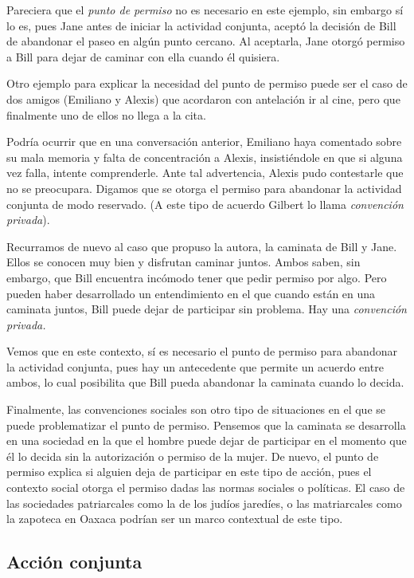 \documentclass[oneside]{book}
\begin{document}
Pareciera que el \textit{punto de permiso} no es necesario en este ejemplo, sin embargo sí lo es, pues Jane antes de iniciar la actividad conjunta, aceptó la decisión de Bill de abandonar el paseo en algún punto cercano. Al aceptarla, Jane otorgó permiso a Bill para dejar de caminar con ella cuando él quisiera.

Otro ejemplo para explicar la necesidad del punto de permiso puede ser el caso de dos amigos (Emiliano y Alexis) que acordaron con antelación ir al cine, pero que finalmente uno de ellos no llega a la cita.

Podría ocurrir que en una conversación anterior, Emiliano haya comentado sobre su mala memoria y falta de concentración a Alexis, insistiéndole en que si alguna vez falla, intente comprenderle. Ante tal advertencia, Alexis pudo contestarle que no se preocupara. Digamos que se otorga el permiso para abandonar la actividad conjunta de modo reservado. (A este tipo de acuerdo Gilbert lo llama \textit{convención privada}).

Recurramos de nuevo al caso que propuso la autora, la caminata de Bill y Jane. Ellos se conocen muy bien y disfrutan caminar juntos. Ambos saben, sin embargo, que Bill encuentra incómodo tener que pedir permiso por algo. Pero pueden haber desarrollado un entendimiento en el que cuando están en una caminata juntos, Bill puede dejar de participar sin problema. Hay una \textit{convención privada. }

Vemos que en este contexto, sí es necesario el punto de permiso para abandonar la actividad conjunta, pues hay un antecedente que permite un acuerdo entre ambos, lo cual posibilita que Bill pueda abandonar la caminata cuando lo decida.

Finalmente, las convenciones sociales son otro tipo de situaciones en el que se puede problematizar el punto de permiso. Pensemos que la caminata se desarrolla en una sociedad en la que el hombre puede dejar de participar en el momento que él lo decida sin la autorización o permiso de la mujer. De nuevo, el punto de permiso explica si alguien deja de participar en este tipo de acción, pues el contexto social otorga el permiso dadas las normas sociales o políticas. El caso de las sociedades patriarcales como la de los judíos jaredíes, o las matriarcales como la zapoteca en Oaxaca podrían ser un marco contextual de este tipo.

\subsection*{Acción conjunta}
\end{document}
